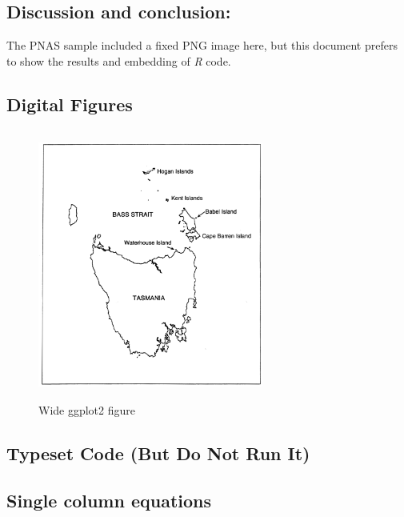 \documentclass[letterpaper,9pt,twocolumn,twoside,]{pinp}
\begin{document}
\hypertarget{discussion-and-conclusion}{%
\subsection{Discussion and
conclusion:}\label{discussion-and-conclusion}}

The PNAS sample included a fixed PNG image here, but this document
prefers to show the results and embedding of \emph{R} code.

\hypertarget{digital-figures}{%
\subsection{Digital Figures}\label{digital-figures}}

\begin{figure}
  \begin{center}
    \includegraphics[width=0.66\textwidth, height=3.5in]{Independence} 
  \end{center}
  \caption{Wide ggplot2 figure}\label{fig}
\end{figure}

\hypertarget{typeset-code-but-do-not-run-it}{%
\subsection{Typeset Code (But Do Not Run
It)}\label{typeset-code-but-do-not-run-it}}

\hypertarget{single-column-equations}{%
\subsection{Single column equations}\label{single-column-equations}}

\showacknow




\end{document}
